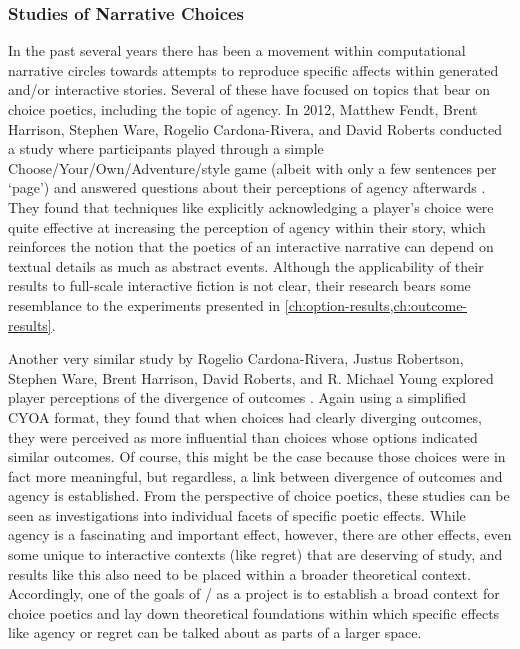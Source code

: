 


\subsubsection{Studies of Narrative Choices}

In the past several years there has been a movement within computational narrative circles towards attempts to reproduce specific affects within generated and/or interactive stories.
%
Several of these have focused on topics that bear on choice poetics, including the topic of agency.
%
In 2012, Matthew Fendt, Brent Harrison, Stephen Ware, Rogelio Cardona-Rivera, and David Roberts conducted a study where participants played through a simple Choose\-/Your\-/Own\-/Adventure\-/style game (albeit with only a few sentences per `page') and answered questions about their perceptions of agency afterwards \citep{Fendt2012}.
%
They found that techniques like explicitly acknowledging a player's choice were quite effective at increasing the perception of agency within their story, which reinforces the notion that the poetics of an interactive narrative can depend on textual details as much as abstract events.
%
Although the applicability of their results to full-scale interactive fiction is not clear, their research bears some resemblance to the experiments presented in \cref{ch:option-results,ch:outcome-results}.


Another very similar study by Rogelio Cardona-Rivera, Justus Robertson, Stephen Ware, Brent Harrison, David Roberts, and R. Michael Young explored player perceptions of the divergence of outcomes \citep{Cardona-Rivera2014}.
%
Again using a simplified CYOA format, they found that when choices had clearly diverging outcomes, they were perceived as more influential than choices whose options indicated similar outcomes.
%
Of course, this might be the case because those choices were in fact more meaningful, but regardless, a link between divergence of outcomes and agency is established.
%
From the perspective of choice poetics, these studies can be seen as investigations into individual facets of specific poetic effects.
%
While agency is a fascinating and important effect, however, there are other effects, even some unique to interactive contexts (like regret) that are deserving of study, and results like this also need to be placed within a broader theoretical context.
%
Accordingly, one of the goals of \dunyazad/ as a project is to establish a broad context for choice poetics and lay down theoretical foundations within which specific effects like agency or regret can be talked about as parts of a larger space.



